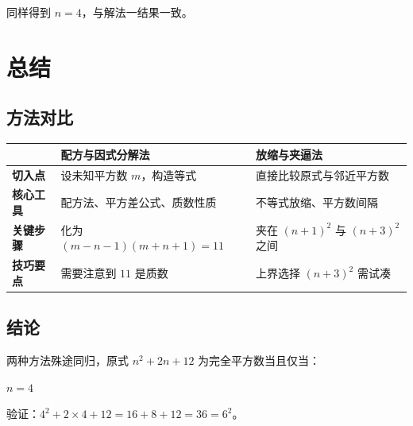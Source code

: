 \documentclass[11pt,a4paper]{ctexart}
\begin{document}
同样得到 $n=4$，与解法一结果一致。

\section{总结}

\begin{summarybox}

\subsection*{方法对比}

\begin{tabular}{@{}>{\sffamily\bfseries}p{2.6cm} p{5.5cm} p{5.5cm}@{}}
\toprule
& \color{maincolor} \textbf{配方与因式分解法} & \color{borderblue} \textbf{放缩与夹逼法} \\
\midrule
\textbf{切入点}   & 设未知平方数 $m$，构造等式 & 直接比较原式与邻近平方数 \\
\textbf{核心工具} & 配方法、平方差公式、质数性质 & 不等式放缩、平方数间隔 \\
\textbf{关键步骤} & 化为 $(m-n-1)(m+n+1)=11$ & 夹在 $(n+1)^2$ 与 $(n+3)^2$ 之间 \\
\textbf{技巧要点} & 需要注意到 $11$ 是质数 & 上界选择 $(n+3)^2$ 需试凑 \\
\bottomrule
\end{tabular}

\vspace{1em}

\subsection*{结论}

两种方法殊途同归，原式 $n^2 + 2n + 12$ 为完全平方数当且仅当：

\begin{center}
\begin{tcolorbox}[
  enhanced, colframe=accent!80, colback=accent!10,
  sharp corners, boxrule=1.5pt, width=6cm, center,
]
  {\color{maincolor}\sffamily\bfseries\LARGE $n = 4$}
\end{tcolorbox}
\end{center}

验证：$4^2 + 2 \times 4 + 12 = 16 + 8 + 12 = 36 = 6^2$。

\end{summarybox}
\end{document}

